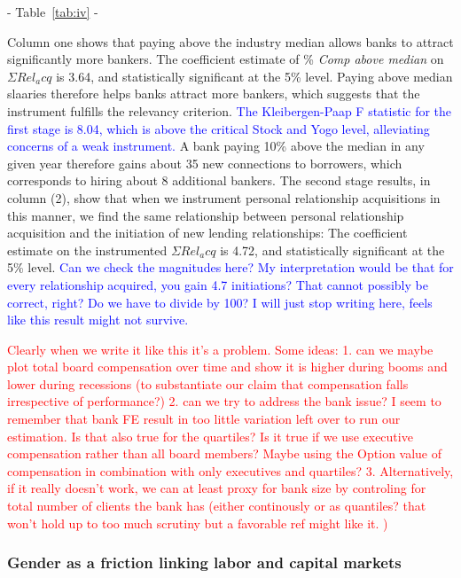 \begin{center} - Table~\ref{tab:iv} - \end{center}

Column one shows that paying above the industry median allows banks to attract significantly more bankers. The coefficient estimate of \% \emph{Comp above median} on $\Sigma Rel_acq$ is 3.64, and statistically significant at the 5\% level. Paying above median slaaries therefore helps banks attract more bankers, which suggests that the instrument fulfills the relevancy criterion. \textcolor{blue}{The Kleibergen-Paap F statistic for the first stage is 8.04, which is above the critical Stock and Yogo level, alleviating concerns of a weak instrument.} A bank paying 10\% above the median in any given year therefore gains about 35 new connections to borrowers, which corresponds to hiring about 8 additional bankers. The second stage results, in column (2), show that when we instrument personal relationship acquisitions in this manner, we find the same relationship between personal relationship acquisition and the initiation of new lending relationships: The coefficient estimate on the instrumented $\Sigma Rel_acq$ is 4.72, and statistically significant at the 5\% level. \textcolor{blue}{Can we check the magnitudes here? My interpretation would be that for every relationship acquired, you gain 4.7 initiations? That cannot possibly be correct, right? Do we have to divide by 100? I will just stop writing here, feels like this result might not survive.}

\textcolor{red}{Clearly when we write it like this it's a problem. Some ideas: 1. can we maybe plot total board compensation over time and show it is higher during booms and lower during recessions (to substantiate our claim that compensation falls irrespective of performance?)  2. can we try to address the bank issue? I seem to remember that bank FE result in too little variation left over to run our estimation. Is that also true for the quartiles? Is it true if we use executive compensation rather than all board members? Maybe using the Option value of compensation in combination with only executives and quartiles? 3. Alternatively, if it really doesn't work, we can at least proxy for bank size by controling for total number of clients the bank has (either continously or as quantiles? that won't hold up to too much scrutiny but a favorable ref might like it. )}
\subsubsection{Gender as a friction linking labor and capital markets}

